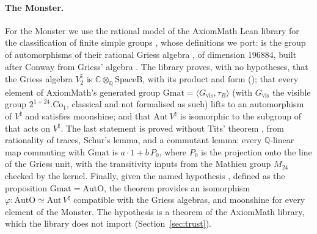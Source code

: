 \documentclass[10pt]{article}
\newcommand{\C}{\mathbb{C}}
\newcommand{\Vn}{V^\natural}
\begin{document}
\paragraph{The Monster.} For the Monster we use the rational model of the AxiomMath Lean library for the
classification of finite simple groups \cite{AxiomCFSG}, whose definitions we port:  is the group of
automorphisms of their rational Griess algebra , of dimension $196884$, built after Conway
\cite{Conway85} from Griess' algebra \cite{Griess}. The library proves, with no hypotheses, that the Griess algebra
$\Vn_2$ is $\C\otimes_{\mathbb Q}\mathrm{SpaceB}$, with its product and form (); that every element of AxiomMath's generated
group $\mathrm{Gmat}=\langle G_{\mathrm{vis}},\tau_B\rangle$ (with $G_{\mathrm{vis}}$ the visible group
$2^{1+24}.\mathrm{Co}_1$, classical and not formalised as such) lifts to an automorphism of $\Vn$ and satisfies
moonshine; and that $\mathrm{Aut}\,\Vn$ is isomorphic to the subgroup of  that acts on $\Vn$. The last
statement is proved without Tits' theorem \cite{Tits}, from rationality of traces, Schur's lemma, and a commutant
lemma: every $\mathbb Q$-linear map commuting with $\mathrm{Gmat}$ is $a\cdot1+b\,P_0$, where $P_0$ is the projection onto
the line of the Griess unit, with the transitivity inputs from the Mathieu group $M_{24}$ checked by the kernel. Finally, given
the named hypothesis , defined as the proposition $\mathrm{Gmat}=\mathrm{AutO}$, the theorem
 provides an isomorphism $\varphi:\mathrm{AutO}\simeq\mathrm{Aut}\,\Vn$ compatible with the
Griess algebras, and moonshine for every element of the Monster. The hypothesis is a theorem of the AxiomMath library,
which the library does not import (Section~\ref{sec:trust}).
\end{document}
